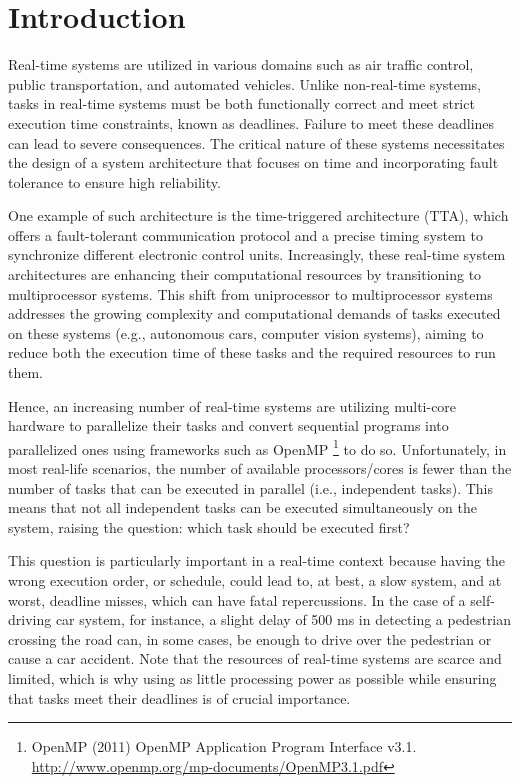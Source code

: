 \section{Introduction}
\label{sec:intro}

Real-time systems are utilized in various domains such as air traffic 
control, public transportation, and automated vehicles. Unlike non-real-time systems, 
tasks in real-time systems must be both functionally correct and meet strict 
 execution time constraints, known as deadlines. Failure 
to meet these deadlines can lead to severe consequences. The critical 
nature of these systems necessitates the design of a system 
architecture that focuses on time and incorporating fault tolerance 
to ensure high reliability.

One example of such architecture is the time-triggered 
architecture (TTA)\cite{kopetz2003tta}\cite{kopetz1998timetriggered}, which offers a fault-tolerant 
communication protocol and a precise timing system to synchronize different electronic control units. 
Increasingly, these real-time system architectures are enhancing their 
computational resources by transitioning to multiprocessor systems. 
This shift from uniprocessor to multiprocessor systems addresses 
the growing complexity and computational demands of tasks executed 
on these systems (e.g., autonomous cars, computer vision systems), aiming to reduce both the execution time of these 
tasks and the required resources to run them\cite{maiza2019survey}.

Hence, an increasing number of real-time systems are 
utilizing multi-core hardware to parallelize their tasks 
and convert sequential programs into parallelized ones using 
frameworks such as OpenMP
\footnote{OpenMP (2011) OpenMP Application Program Interface v3.1. 
\url{http://www.openmp.org/mp-documents/OpenMP3.1.pdf}} to do so. 
Unfortunately, in most real-life scenarios, the number of available 
processors/cores is fewer than the number of tasks that 
can be executed in parallel (i.e., independent tasks). This means 
that not all independent tasks can be executed simultaneously on 
the system, raising the question: which task should be executed first?

This question is particularly important in a real-time context
because having the wrong execution order, or schedule, could lead 
to, at best, a slow system, and at worst, deadline misses, which 
can have fatal repercussions\cite{ABBOTT2018RealtimeDeadlineMissCons}. In the case of a self-driving car 
system, for instance, a slight delay of 500 ms in detecting a pedestrian 
crossing the road can, in some cases, be enough to drive over 
the pedestrian or cause a car accident. Note that the resources of 
real-time systems are scarce and limited, which is why using as 
little processing power as possible while ensuring that tasks meet 
their deadlines is of crucial importance.

